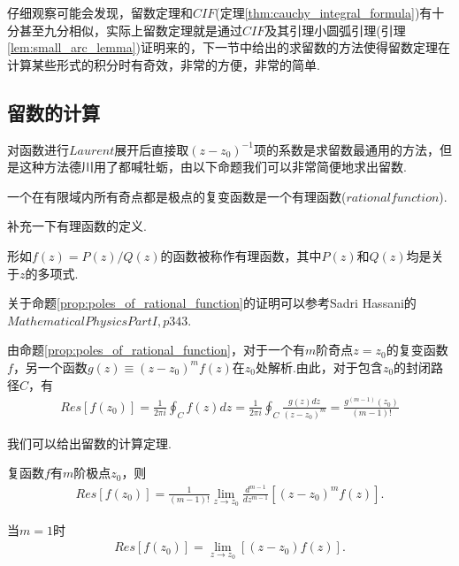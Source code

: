         仔细观察可能会发现，留数定理和$CIF$(定理\ref{thm:cauchy_integral_formula})有十分甚至九分相似，实际上留数定理就是通过$CIF$及其引理小圆弧引理(引理\ref{lem:small_arc_lemma})证明来的，下一节中给出的求留数的方法使得留数定理在计算某些形式的积分时有奇效，非常的方便，非常的简单.

    \subsection{留数的计算}
        对函数进行$Laurent$展开后直接取$(z-z_0)^{-1}$项的系数是求留数最通用的方法，但是这种方法德川用了都喊牡蛎，由以下命题我们可以非常简便地求出留数.

        \begin{proposition}\label{prop:poles_of_rational_function}
            一个在有限域内所有奇点都是极点的复变函数是一个有理函数($rational function$).
        \end{proposition}

        补充一下有理函数的定义.

        \begin{definition}[有理函数]\label{def:rational_function}
            形如$f(z)=P(z)/Q(z)$的函数被称作有理函数，其中$P(z)$和$Q(z)$均是关于$z$的多项式.
        \end{definition}
        
        关于命题\ref{prop:poles_of_rational_function}的证明可以参考Sadri Hassani的$Mathematical Physics PartI, p343$.

        由命题\ref{prop:poles_of_rational_function}，对于一个有$m$阶奇点$z=z_0$的复变函数$f$，另一个函数$g(z)\equiv (z-z_0)^mf(z)$在$z_0$处解析.由此，对于包含$z_0$的封闭路径$C$，有
        \begin{align*}
            Res[f(z_0)]=\frac1{2\pi i}\oint_{C}f(z)dz=\frac1{2\pi i}\oint_C \frac{g(z)dz}{(z-z_0)^m}=\frac{g^{(m-1)}(z_0)}{(m-1)!}
        \end{align*}

        我们可以给出留数的计算定理.

        \begin{theorem}
            复函数$f$有$m$阶极点$z_0$，则
            \begin{align*}
                Res\left[f(z_0)\right]=\frac1{(m-1)!}\lim_{z\to z_0}\frac{d^{m-1}}{dz^{m-1}}\left[(z-z_0)^mf(z)\right].
            \end{align*}
        \end{theorem}

        当$m=1$时
        \begin{align*}
            Res\left[f(z_0)\right]=\lim_{z\to z_0}\left[(z-z_0)f(z)\right].
        \end{align*}

